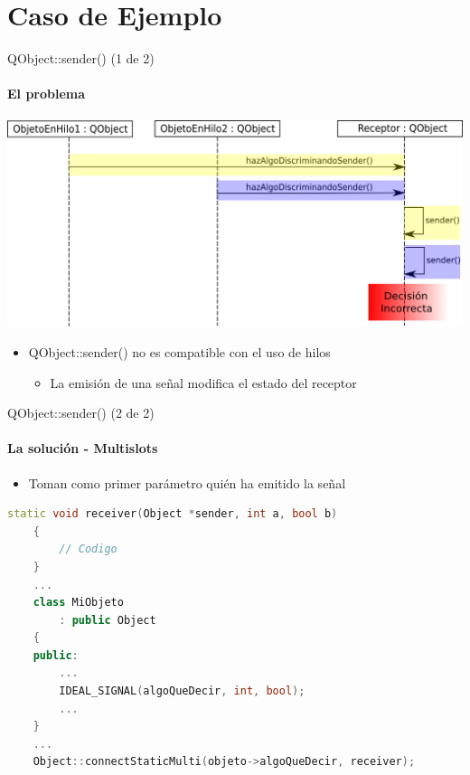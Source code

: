 \documentclass{beamer}
\begin{document}
\section{Caso de Ejemplo}

\begin{frame}{QObject::sender() (1 de 2)}
    \framesubtitle{El problema}
    \includegraphics[scale=0.29]{diagSecuenciaSender.png}
    \medskip
    \begin{itemize}
        \item QObject::sender() no es compatible con el uso de hilos
        \begin{itemize}
            \item La emisión de una señal modifica el estado del receptor
        \end{itemize}
    \end{itemize}
\end{frame}

\begin{frame}[fragile]{QObject::sender() (2 de 2)}
    \framesubtitle{La solución - Multislots}
    \begin{itemize}
        \item Toman como primer parámetro quién ha emitido la señal
    \end{itemize}
\begin{lstlisting}[language=C++]
    static void receiver(Object *sender, int a, bool b)
    {
        // Codigo
    }
    ...
    class MiObjeto
        : public Object
    {
    public:
        ...
        IDEAL_SIGNAL(algoQueDecir, int, bool);
        ...
    }
    ...
    Object::connectStaticMulti(objeto->algoQueDecir, receiver);
\end{lstlisting}
\end{frame}
\end{document}
